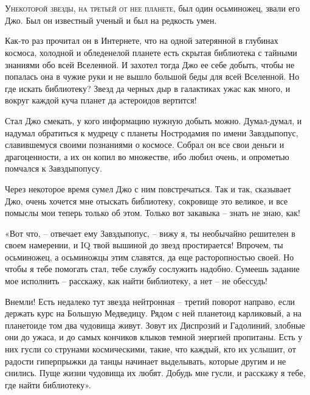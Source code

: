 \documentclass[ebook,oneside,final,openright]{memoir}
\begin{document}
\chapter{}
 \lettrine{У}{некоторой звезды, на третьей от нее планете,} был один осьминожец, звали его Джо. Был он известный ученый и был на редкость умен.\par
\par
Как-то раз прочитал он в Интернете, что на одной затерянной в глубинах космоса, холодной и обледенелой планете есть скрытая библиотека с тайными знаниями обо всей Вселенной. И захотел тогда Джо ее себе добыть, чтобы не попалась она в чужие руки и не вышло большой беды для всей Вселенной. Но где искать библиотеку? Звезд да черных дыр в галактиках ужас как много, и вокруг каждой куча планет да астероидов вертится!\par
\par
Стал Джо смекать, у кого информацию нужную добыть можно. Думал-думал, и надумал обратиться к мудрецу с планеты Ностродамия по имени Завздыпопус, славившемуся своими познаниями о космосе. Собрал он все свои деньги и драгоценности, а их он копил во множестве, ибо любил очень, и опрометью помчался к Завздыпопусу.\par
\par
Через некоторое время сумел Джо с ним повстречаться. Так и так, сказывает Джо, очень хочется мне отыскать библиотеку, сокровище это великое, и все помыслы мои теперь только об этом. Только вот закавыка – знать не знаю, как!\par
\par
«Вот что, – отвечает ему Завздыпопус, – вижу я, ты необычайно решителен в своем намерении, и IQ твой вышиной до звезд простирается! Впрочем, ты осьминожец, а осьминожцы этим славятся, да еще расторопностью своей. Но чтобы я тебе помогать стал, тебе службу сослужить надобно. Сумеешь задание мое исполнить – расскажу, как найти библиотеку, а нет – не обессудь!\par
\par
Внемли! Есть недалеко тут звезда нейтронная – третий поворот направо, если держать курс на Большую Медведицу. Рядом с ней планетоид карликовый, а на планетоиде том два чудовища живут. Зовут их Диспрозий и Гадолиний, злобные они до ужаса, и до самых кончиков клыков темной энергией пропитаны. Есть у них гусли со струнами космическими, такие, что каждый, кто их услышит, от радости гиперпрыжки да танцы начинает выделывать, которые другим и не снились. Пуще жизни чудовища их любят. Добудь мне гусли, и расскажу я тебе, где найти библиотеку».\par
\end{document}
